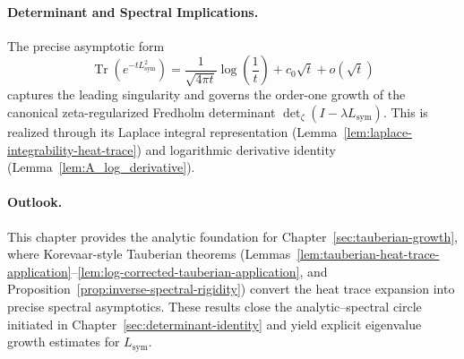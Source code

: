 \paragraph{Determinant and Spectral Implications.}
The precise asymptotic form
\[
\operatorname{Tr}(e^{-t L_{\mathrm{sym}}^2}) = \frac{1}{\sqrt{4\pi t}} \log\left( \frac{1}{t} \right) + c_0 \sqrt{t} + o(\sqrt{t})
\]
captures the leading singularity and governs the order-one growth of the canonical zeta-regularized Fredholm determinant \( \det\nolimits_{\zeta}(I - \lambda L_{\mathrm{sym}}) \). This is realized through its Laplace integral representation (Lemma~\ref{lem:laplace-integrability-heat-trace}) and logarithmic derivative identity (Lemma~\ref{lem:A_log_derivative}).

\paragraph{Outlook.}
This chapter provides the analytic foundation for Chapter~\ref{sec:tauberian-growth}, where Korevaar-style Tauberian theorems (Lemmas~\ref{lem:tauberian-heat-trace-application}–\ref{lem:log-corrected-tauberian-application}, and Proposition~\ref{prop:inverse-spectral-rigidity}) convert the heat trace expansion into precise spectral asymptotics. These results close the analytic–spectral circle initiated in Chapter~\ref{sec:determinant-identity} and yield explicit eigenvalue growth estimates for \( L_{\mathrm{sym}} \).
